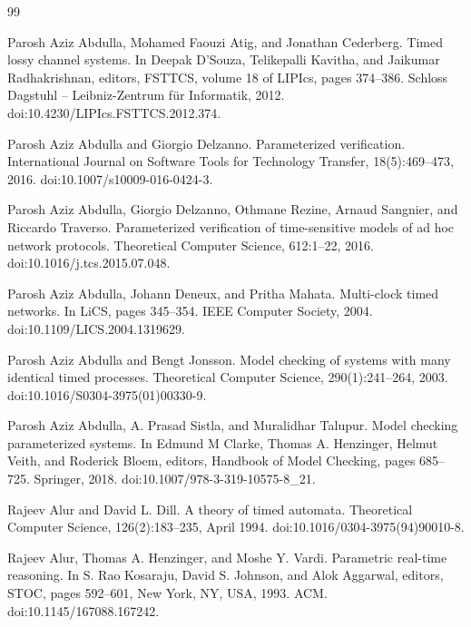 \documentclass[10pt,a4paper]{article}
\begin{document}
\begin{thebibliography}{99}
\par\noindent    Parosh Aziz Abdulla, Mohamed Faouzi Atig, and Jonathan Cederberg.  Timed lossy channel systems.  In Deepak D’Souza, Telikepalli Kavitha, and Jaikumar Radhakrishnan, editors, FSTTCS, volume 18 of LIPIcs, pages 374--386. Schloss Dagstuhl -- Leibniz-Zentrum für Informatik, 2012.  doi:10.4230/LIPIcs.FSTTCS.2012.374.  

\par\noindent    Parosh Aziz Abdulla and Giorgio Delzanno.  Parameterized verification.  International Journal on Software Tools for Technology Transfer, 18(5):469--473, 2016.  doi:10.1007/s10009-016-0424-3.  

\par\noindent    Parosh Aziz Abdulla, Giorgio Delzanno, Othmane Rezine, Arnaud Sangnier, and Riccardo Traverso.  Parameterized verification of time-sensitive models of ad hoc network protocols.  Theoretical Computer Science, 612:1--22, 2016.  doi:10.1016/j.tcs.2015.07.048.  

\par\noindent    Parosh Aziz Abdulla, Johann Deneux, and Pritha Mahata.  Multi-clock timed networks.  In LiCS, pages 345--354. IEEE Computer Society, 2004.  doi:10.1109/LICS.2004.1319629.  

\par\noindent    Parosh Aziz Abdulla and Bengt Jonsson.  Model checking of systems with many identical timed processes.  Theoretical Computer Science, 290(1):241--264, 2003.  doi:10.1016/S0304-3975(01)00330-9.  

\par\noindent    Parosh Aziz Abdulla, A. Prasad Sistla, and Muralidhar Talupur.  Model checking parameterized systems.  In Edmund M Clarke, Thomas A. Henzinger, Helmut Veith, and Roderick Bloem, editors, Handbook of Model Checking, pages 685--725. Springer, 2018.  doi:10.1007/978-3-319-10575-8\_21.  

\par\noindent    Rajeev Alur and David L. Dill.  A theory of timed automata.  Theoretical Computer Science, 126(2):183--235, April 1994.  doi:10.1016/0304-3975(94)90010-8.  

\par\noindent    Rajeev Alur, Thomas A. Henzinger, and Moshe Y. Vardi.  Parametric real-time reasoning.  In S. Rao Kosaraju, David S. Johnson, and Alok Aggarwal, editors, STOC, pages 592--601, New York, NY, USA, 1993. ACM.  doi:10.1145/167088.167242.  


\end{thebibliography}
\end{document}
